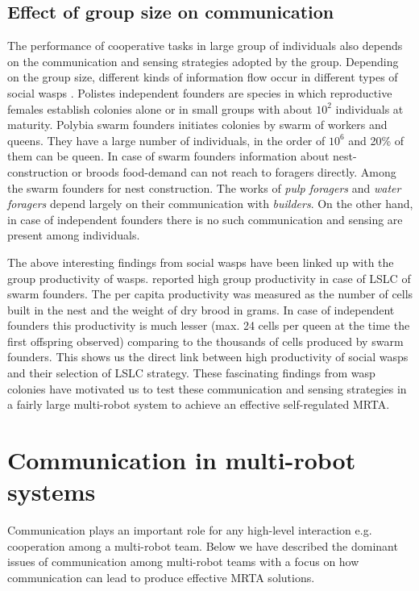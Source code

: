 \documentclass{intech}
\begin{document}
\subsection{Effect of group size on communication}
\label{bg:bio-comm:group-size}
The performance of cooperative tasks in large group of individuals also depends on the communication and sensing strategies adopted by the group. Depending on the group size, different kinds of information flow occur in different types of social wasps \citep{Jeanne1999}. Polistes independent founders  are species in which reproductive females establish colonies alone or in small groups with about $10^2$ individuals at maturity. Polybia swarm founders initiates colonies by swarm of workers and queens. They have a large number of individuals, in the order of $10^6$ and 20\% of them can be queen. In case of swarm founders information about nest-construction or broods food-demand can not reach to foragers directly.  Among the swarm founders for nest construction. The works of {\em pulp foragers} and {\em water foragers} depend largely on their communication with {\em builders}. On the other hand, in case of independent founders there is no such communication and sensing are present among individuals.

The above interesting findings from social wasps have been linked up with  the group productivity of wasps. \cite{Jeanne1999} reported high group productivity in case of LSLC of swarm founders. The per capita productivity was measured as the number of cells built in the nest and the weight of dry brood in grams. In case of independent founders this productivity is much lesser (max. 24 cells per queen at the time the first offspring observed) comparing to the thousands of cells produced by swarm founders.  This shows  us the direct link between high productivity of social wasps and their selection of LSLC strategy. These fascinating findings from wasp colonies have motivated us to test these communication and sensing strategies in a fairly large multi-robot system to achieve an effective self-regulated MRTA.
\section{Communication in multi-robot systems}
\label{mrs-comm}
\label{bg:mrs-comm}
Communication plays an important role for any high-level interaction e.g. cooperation among a multi-robot team. Below we have described the dominant issues of communication among multi-robot teams with a focus on how communication  can lead to produce effective MRTA solutions.
\end{document}
